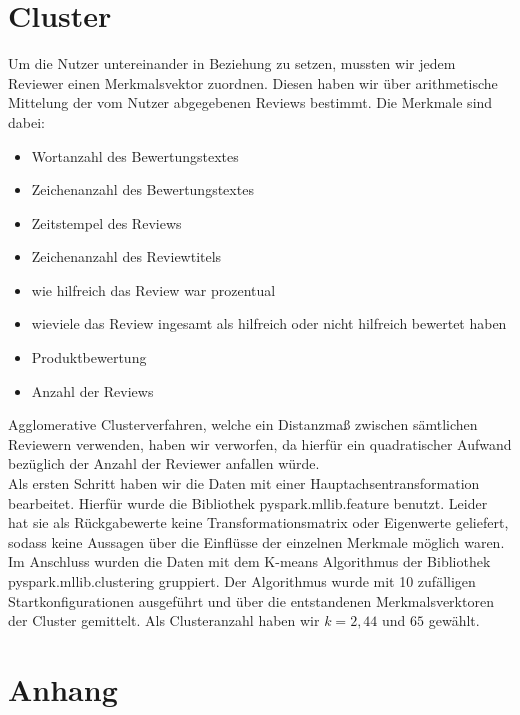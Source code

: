 \documentclass{scrartcl}
\theoremstyle{my_th_style}
\begin{document}
\section{Cluster}
Um die Nutzer untereinander in Beziehung zu setzen, mussten wir jedem Reviewer einen Merkmalsvektor zuordnen. Diesen haben wir über arithmetische Mittelung der vom Nutzer abgegebenen Reviews bestimmt. Die Merkmale sind dabei:
\begin{itemize}
\item Wortanzahl des Bewertungstextes
\item Zeichenanzahl des Bewertungstextes
\item Zeitstempel des Reviews
\item Zeichenanzahl des Reviewtitels
\item wie hilfreich das Review war prozentual
\item wieviele das Review ingesamt als hilfreich oder nicht hilfreich bewertet haben
\item Produktbewertung
\item Anzahl der Reviews
\end{itemize}

Agglomerative Clusterverfahren, welche ein Distanzmaß zwischen sämtlichen Reviewern verwenden, haben wir verworfen, da hierfür ein quadratischer Aufwand bezüglich der Anzahl der Reviewer anfallen würde.\\
Als ersten Schritt haben wir die Daten mit einer Hauptachsentransformation bearbeitet. Hierfür wurde die Bibliothek pyspark.mllib.feature benutzt. Leider hat sie als Rückgabewerte keine Transformationsmatrix oder Eigenwerte geliefert, sodass keine Aussagen über die Einflüsse der einzelnen Merkmale möglich waren. Im Anschluss wurden die Daten mit dem K-means Algorithmus der Bibliothek pyspark.mllib.clustering gruppiert. Der Algorithmus wurde mit 10 zufälligen Startkonfigurationen ausgeführt und über die entstandenen Merkmalsverktoren der Cluster gemittelt. Als Clusteranzahl haben wir $k=2,44$ und $65$ gewählt.

\newpage
\section*{Anhang}
\end{document}
